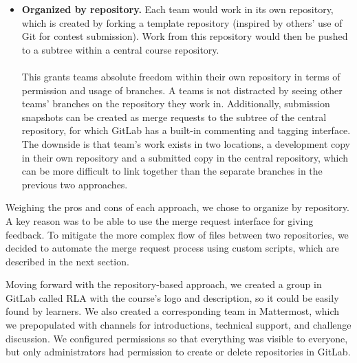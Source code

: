 \documentclass[12pt,twoside]{mitthesis}
\begin{document}
{\begin{itemize}
The drawback of this method is the disparity between such use of branches and what branches are typically used for. Branches are usually for work-in-progress features or experiments with the intention of eventually merging the branch back. However, here they would be used by teams pursuing totally separate projects in the same place on different branches, which wouldn't make sense to eventually merge. This disparity would potentially confuse users previously familiar with Git and teach improper skills for those who go on to use Git beyond the course.
\item \textbf{Organized by repository.} Each team would work in its own repository, which is created by forking a template repository (inspired by others' use of Git for contest submission). Work from this repository would then be pushed to a subtree within a central course repository.\\ \\
This grants teams absolute freedom within their own repository in terms of permission and usage of branches. A teams is not distracted by seeing other teams' branches on the repository they work in. Additionally, submission snapshots can be created as merge requests to the subtree of the central repository, for which GitLab has a built-in commenting and tagging interface. The downside is that team's work exists in two locations, a development copy in their own repository and a submitted copy in the central repository, which can be more difficult to link together than the separate branches in the previous two approaches.
\end{itemize}
Weighing the pros and cons of each approach, we chose to organize by repository. A key reason was to be able to use the merge request interface for giving feedback. To mitigate the more complex flow of files between two repositories, we decided to automate the merge request process using custom scripts, which are described in the next section.

Moving forward with the repository-based approach, we created a group in GitLab called RLA with the course's logo and description, so it could be easily found by learners. We also created a corresponding team in Mattermost, which we prepopulated with channels for introductions, technical support, and challenge discussion. We configured permissions so that everything was visible to everyone, but only administrators had permission to create or delete repositories in GitLab.

}
\end{document}
